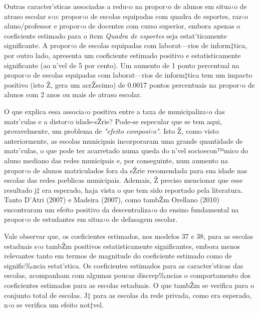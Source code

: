 \documentclass[a4paper, 12pt]{article}
\begin{document}
Outras caracter’sticas associadas a redu‹o na propor‹o de alunos em situa‹o de atraso escolar s‹o: propor‹o de escolas equipadas com quadra de esportes, raz‹o aluno/professor e propor‹o de docentes com curso superior, embora apenas o coeficiente estimado para o item \emph{Quadra de esportes} seja estat’ticamente significante. A propor‹o de escolas equipadas com laborat—rios de inform‡tica, por outro lado, apresenta um coeficiente estimado positivo e estatisticamente significante (ao n’vel de 5 por cento). Um aumento de 1 ponto percentual na propor‹o de escolas equipadas com laborat—rios de inform‡tica tem um impacto positivo (isto Ž, gera um acrŽscimo) de 0.0017 pontos percentuais na propor‹o de alunos com 2 anos ou mais de atraso escolar.

O que explica essa associa‹o positiva entre a taxa de municipaliza‹o das matr’culas e a distor‹o idade-sŽrie? Pode-se especular que se tem aqui, provavelmente, um problema de \emph{"efeito composi‹o"}. Isto Ž, como visto anteriormente, as escolas municipais incorporaram uma grande quantidade de matr’culas, o que pode ter acarretado numa queda do n’vel socioecon™mico do aluno mediano das redes municipais e, por conseguinte, num aumento na propor‹o de alunos matriculados fora da sŽrie recomendada para sua idade nas escolas das redes pœblicas municipais. Ademais, Ž preciso mencionar que esse resultado j‡ era esperado, haja vista o que tem sido reportado pela literatura. Tanto D'Atri (2007) e Madeira (2007), como tambŽm Orellano (2010) encontraram um efeito positivo da descentraliza‹o do ensino fundamental na propor‹o de estudantes em situa‹o de defasagem escolar. 

Vale observar que, os coeficientes estimados, nos modelos 37 e 38, para as escolas estaduais s‹o tambŽm positivos estatisticamente significantes, embora menos relevantes tanto em termos de magnitude do coeficiente estimado como de signific‰ncia estat’stica. Os coeficientes estimados para as caracter’sticas das escolas, acompanham com algumas poucas discrep‰ncias o comportamento dos coeficientes estimados para as escolas estaduais. O que tambŽm se verifica para o conjunto total de escolas. J‡ para as escolas da rede privada, como era esperado, n‹o se verifica um efeito not‡vel.
\end{document}
